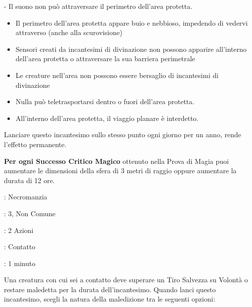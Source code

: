 \begin{multicols}{2}
\noindent- Il suono non può attraversare il perimetro dell'area protetta.

\begin{itemize}[leftmargin=*] \setlength{\itemsep}{0pt}
	\item Il perimetro dell'area protetta appare buio e nebbioso, impedendo di vedervi attraverso (anche alla scurovisione)
	\item Sensori creati da incantesimi di divinazione non possono apparire all'interno dell'area protetta o attraversare la sua barriera perimetrale
	\item Le creature nell'area non possono essere bersaglio di incantesimi di divinazione
	\item Nulla può teletrasportarsi dentro o fuori dell'area protetta.
	\item All'interno dell'area protetta, il viaggio planare è interdetto.
\end{itemize}

Lanciare questo incantesimo sullo stesso punto ogni giorno per un anno, rende l'effetto permanente.

\textbf{Per ogni Successo Critico Magico} ottenuto nella Prova di Magia puoi aumentare le dimensioni della sfera di 3 metri di raggio oppure aumentare la durata di 12 ore.

\noindent\colorbox{OBSSgold!10}{
\begin{minipage}{0.95\linewidth}
\begin{description}[noitemsep, topsep=0pt, parsep=0pt, partopsep=0pt, leftmargin=0cm, labelwidth=1.3cm]
	\item[\textbf{Lista}]: Necromanzia
	\item[\textbf{Livello}]: 3, Non Comune
	\item[\textbf{Lancio}]: 2 Azioni
	\item[\textbf{Gittata}]: Contatto
	\item[\textbf{Durata}]: 1 minuto
\end{description}
\end{minipage}}\smallskip

Una creatura con cui sei a contatto deve superare un Tiro Salvezza su Volontà o restare maledetta per la durata dell'incantesimo. Quando lanci questo incantesimo, scegli la natura della maledizione tra le seguenti opzioni:


\end{multicols}
